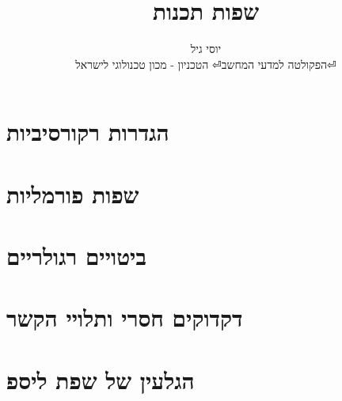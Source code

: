 \documentclass[a4paper,12pt,reqno]{article}
\title{שפות תכנות}
\author{
יוסי גיל \\
הפקולטה למדעי המחשב⏎
הטכניון - מכון טכנולוגי לישראל⏎
}
\begin{document}
\maketitle
\section{הגדרות רקורסיביות}

\section{שפות פורמליות}

\section{ביטויים רגולריים}

\section{דקדוקים חסרי ותלויי הקשר}

%
\section{הגלעין של שפת ליספ}

\end{document}
